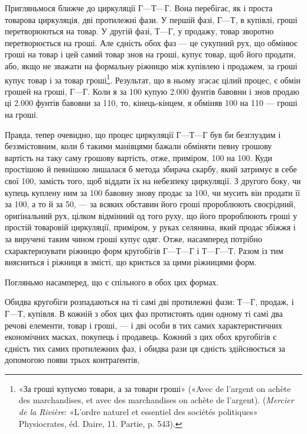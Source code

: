 Пригляньмося ближче до циркуляції $Г — Т — Г$. Вона перебігає,
як і проста товарова циркуляція, дві протилежні фази.
У першій фазі, $Г — Т$, в купівлі, гроші перетворюються на товар.
У другій фазі, $Т — Г$, у продажу, товар зворотно перетворюється
на гроші. Але єдність обох фаз — це сукупний рух, що
обмінює гроші на товар і цей самий товар знов на гроші, купує
товар, щоб його продати, або, якщо не зважати на формальну
ріжницю між купівлею і продажем, за гроші купує товар і за
товар гроші\footnote{
«За гроші купуємо товари, а за товари гроші» («Avec de l’argent
on achète des marchandises, et avec des marchandises on achète de l’argent).
(\emph{Mercier de la Rivière}: «L’ordre naturel et essentiel des sociétés
politiques» Physiocrates, éd. Daire, 11. Partie, p. 543).
}. Результат, що в ньому згасає цілий процес, є
обмін грошей на гроші, $Г — Г$. Коли я за 100
купую \num{2.000} фунтів бавовни і знов продаю ці \num{2.000} фунтів
бавовни за 110, то, кінець-кінцем, я
обміняв 100 на 110 — гроші
на гроші.

Правда, тепер очевидно, що процес циркуляції $Г — Т — Г$
був би безглуздим і беззмістовним, коли б такими манівцями
бажали обміняти певну грошову вартість на таку саму грошову
вартість, отже, приміром, 100 на 100. Куди простішою й певнішою лишалася б метода
збирача скарбу, який затримує в себе свої 100,
замість того, щоб віддати їх на небезпеку циркуляції. З другого
боку, чи купець куплену ним за 100 бавовну
знову продає за 100, чи мусить він продати її за
100, а то й за 50, — за всяких
обставин його гроші пророблюють своєрідний, ориґінальний
рух, цілком відмінний од того руху, що його пророблюють
гроші у простій товаровій циркуляції, приміром, у руках селянина,
який продає збіжжя і за виручені таким чином гроші
купує одяг. Отже, насамперед потрібно схарактеризувати ріжницю
форм кругобігів $Г — Т — Г$ і $Т — Г — Т$. Разом із тим
виясниться і ріжниця в змісті, що криється за цими ріжницями
форм.

Погляньмо насамперед, що є спільного в обох цих формах.

Обидва кругобіги розпадаються на ті самі дві протилежні
фази: $Т — Г$, продаж, і $Г — Т$, купівля. В кожній з обох цих
фаз протистоять один одному ті самі два речові елементи, товар
і гроші, — і дві особи в тих самих характеристичних економічних
масках, покупець і продавець. Кожний з цих обох кругобігів
є єдність тих самих протилежних фаз, і обидва рази ця
єдність здійснюється за допомогою появи трьох контраґентів,
\parbreak{}  %
